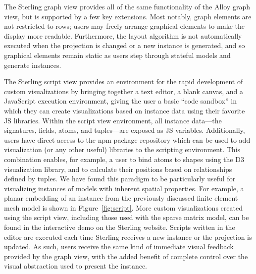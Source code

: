 \documentclass[runningheads]{llncs}
\begin{document}
The Sterling graph view provides all of the same functionality of the Alloy graph view, but is supported by a few key extensions. 
Most notably, graph elements are not restricted to rows; users may freely arrange graphical elements to make the display more readable. 
Furthermore, the layout algorithm is not automatically executed when the projection is changed or a new instance is generated, and so graphical elements remain static as users step through stateful models and generate instances.

The Sterling script view provides an environment for the rapid development of custom visualizations by bringing together a text editor, a blank canvas, and a JavaScript execution environment, giving the user a basic ``code sandbox'' in which they can create visualizations based on instance data using their favorite JS libraries.
Within the script view environment, all instance data---the signatures, fields, atoms, and tuples---are exposed as JS variables. 
Additionally, users have direct access to the npm package repository which can be used to add visualization (or any other useful) libraries to the scripting environment.
This combination enables, for example, a user to bind atoms to shapes using the D3 visualization library, and to calculate their positions based on relationships defined by tuples.
We have found this paradigm to be particularly useful for visualizing instances of models with inherent spatial properties.
For example, a planar embedding of an instance from the previously discussed finite element mesh model is shown in Figure~\ref{fig:script}. More custom visualizations created using the script view, including those used with the sparse matrix model, can be found in the interactive demo on the Sterling website.
Scripts written in the editor are executed each time Sterling receives a new instance or the projection is updated. 
As such, users receive the same kind of immediate visual feedback provided by the graph view, with the added benefit of complete control over the visual abstraction used to present the instance.
\end{document}

